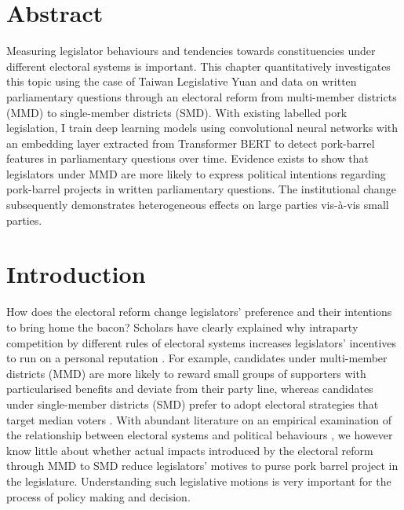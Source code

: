
\section*{\centering Abstract}
\small Measuring legislator behaviours and tendencies towards constituencies under different electoral systems is important. This chapter quantitatively investigates this topic using the case of Taiwan Legislative Yuan and data on written parliamentary questions through an electoral reform from multi-member districts (MMD) to single-member districts (SMD). With existing labelled pork legislation, I train deep learning models using convolutional neural networks with an embedding layer extracted from Transformer BERT to detect pork-barrel features in parliamentary questions over time. Evidence exists to show that legislators under MMD are more likely to express political intentions regarding pork-barrel projects in written parliamentary questions. The institutional change subsequently demonstrates heterogeneous effects on large parties vis-à-vis small parties.  

\clearpage

\section*{\centering Introduction}
How does the electoral reform change legislators' preference and their intentions to bring home the bacon? Scholars have clearly explained why intraparty competition by different rules of electoral systems increases legislators' incentives to run on a personal reputation \citep{Cox1990, Downs1957, Carey1995}. For example, candidates under multi-member districts (MMD) are more likely to reward small groups of supporters with particularised benefits and deviate from their party line, whereas candidates under single-member districts (SMD) prefer to adopt electoral strategies that target median voters \citep{Cox1990}. With abundant literature on an empirical examination of the relationship between electoral systems and political behaviours \citep[e.g.][]{Cox1990, Catalinac2016, Catalinac2017, Goplerud2021}, we however know little about whether actual impacts introduced by the electoral reform through MMD to SMD reduce legislators' motives to purse pork barrel project in the legislature. Understanding such legislative motions is very important for the process of policy making and decision. 

